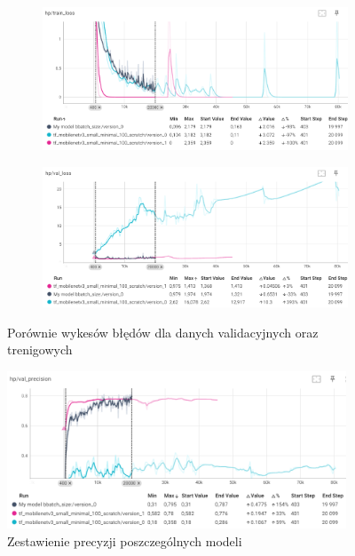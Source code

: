 \documentclass[12pt,twoside]{article}
\begin{document}
\begin{figure}[ht]
	\centering
	\begin{subfigure}[b]{0.9\textwidth}
	  \includegraphics[width=\textwidth]{figures/hp_train_loss.png}
	  \label{fig:obraz1}
	\end{subfigure}
	\hfill
	\begin{subfigure}[b]{0.9\textwidth}
	  \includegraphics[width=\textwidth]{figures/hp_val_loss.png}
	  \label{fig:obraz2}
	\end{subfigure}
	\caption{Porównie wykesów błędów dla danych validacyjnych oraz trenigowych}
	
\end{figure}

\begin{figure}[h]
	\centering
	\includegraphics[width=0.9\textwidth]{figures/hp_val_pre.png}
	\caption{Zestawienie precyzji poszczególnych modeli}
	\label{fig:wsef52ne}
\end{figure}
\end{document}

